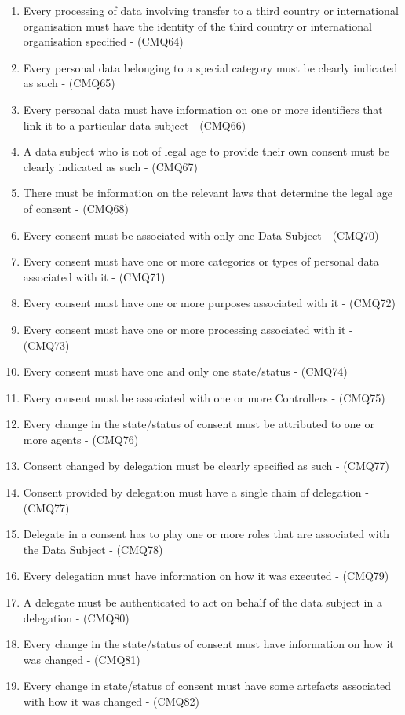 \begin{enumerate}[label={\textit{C.\theenumi}}]
    \item Every processing of data involving transfer to a third country or international organisation must have the identity of the third country or international organisation specified - (CMQ64)
    \item Every personal data belonging to a special category must be clearly indicated as such - (CMQ65)
    \item Every personal data must have information on one or more identifiers that link it to a particular data subject - (CMQ66)
    \item A data subject who is not of legal age to provide their own consent must be clearly indicated as such - (CMQ67)
    \item There must be information on the relevant laws that determine the legal age of consent - (CMQ68)
    \item Every consent must be associated with only one Data Subject - (CMQ70)
    \item Every consent must have one or more categories or types of personal data associated with it - (CMQ71)
    \item Every consent must have one or more purposes associated with it - (CMQ72)
    \item Every consent must have one or more processing associated with it - (CMQ73)
    \item Every consent must have one and only one state/status - (CMQ74)
    \item Every consent must be associated with one or more Controllers - (CMQ75)
    \item Every change in the state/status of consent must be attributed to one or more agents - (CMQ76)
    \item Consent changed by delegation must be clearly specified as such - (CMQ77)
    \item Consent provided by delegation must have a single chain of delegation - (CMQ77)
    \item Delegate in a consent has to play one or more roles that are associated with the Data Subject - (CMQ78)
    \item Every delegation must have information on how it was executed - (CMQ79)
    \item A delegate must be authenticated to act on behalf of the data subject in a delegation - (CMQ80)
    \item Every change in the state/status of consent must have information on how it was changed - (CMQ81)
    \item Every change in state/status of consent must have some artefacts associated with how it was changed - (CMQ82)

\end{enumerate}
